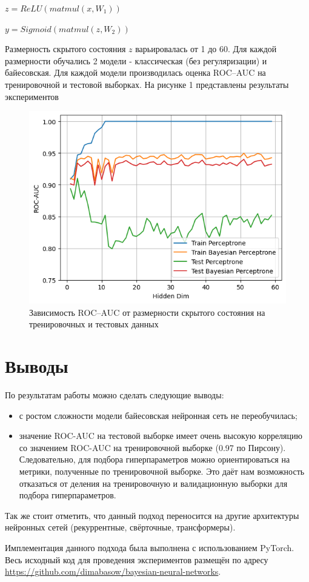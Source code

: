 \documentclass{article}
\begin{document}
$z = ReLU(matmul(x, W_1))$

$y = Sigmoid(matmul(z, W_2))$

Размерность скрытого состояния $z$ варьировалась от 1 до 60. Для каждой размерности обучались 2 модели - классическая (без регуляризации) и байесовская. Для каждой модели производилась оценка ROC--AUC на тренировочной и тестовой выборках. На рисунке 1 представлены результаты экспериментов

\begin{figure}
    \centering
    \includegraphics[width=1\linewidth]{roc_auc.png}
    \caption{Зависимость ROC--AUC от размерности скрытого состояния на тренировочных и тестовых данных}
    \label{fig:enter-label}
\end{figure}

\section{Выводы}
По результатам работы можно сделать следующие выводы:
\begin{itemize}
    \item с ростом сложности модели байесовская нейронная сеть не переобучилась;
    \item значение ROC-AUC на тестовой выборке имеет очень высокую корреляцию со значением ROC-AUC на тренировочной выборке (0.97 по Пирсону). Следовательно, для подбора гиперпараметров можно ориентироваться на метрики, полученные по тренировочной выборке. Это даёт нам возможность отказаться от деления на тренировочную и валидационную выборки для подбора гиперпараметров.
\end{itemize}

Так же стоит отметить, что данный подход переносится на другие архитектуры нейронных сетей (рекуррентные, свёрточные, трансформеры).

Имплементация данного подхода была выполнена с использованием PyTorch. Весь исходный код для проведения экспериментов размещён по адресу \url{https://github.com/dimabasow/bayesian-neural-networks}.
\end{document}
